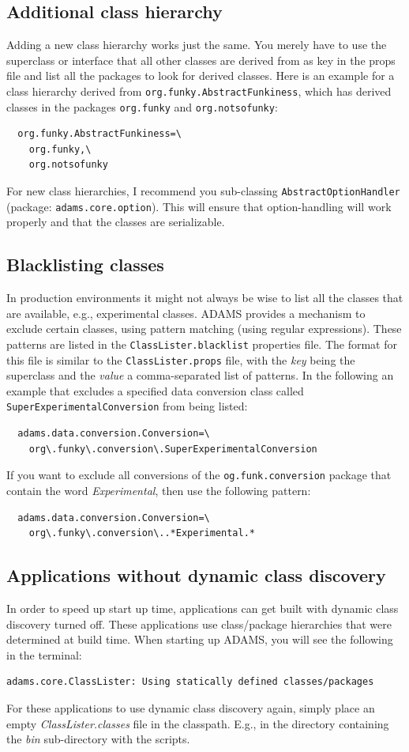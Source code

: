 \subsection{Additional class hierarchy}
Adding a new class hierarchy works just the same. You merely have to use the
superclass or interface that all other classes are derived from as key in the props file and
list all the packages to look for derived classes. Here is an example for a
class hierarchy derived from \texttt{org.funky.AbstractFunkiness}, which has
derived classes in the packages \texttt{org.funky} and \texttt{org.notsofunky}:
\begin{verbatim}
  org.funky.AbstractFunkiness=\
    org.funky,\
    org.notsofunky
\end{verbatim}
For new class hierarchies, I recommend you sub-classing \texttt{AbstractOptionHandler}
(package: \texttt{adams.core.option}). This will ensure that option-handling
will work properly and that the classes are serializable.

\subsection{Blacklisting classes}
In production environments it might not always be wise to list all the classes
that are available, e.g., experimental classes. ADAMS provides a mechanism to
exclude certain classes, using pattern matching (using regular expressions).
These patterns are listed in the \texttt{ClassLister.blacklist} properties file.
The format for this file is similar to the \texttt{ClassLister.props} file, with
the \textit{key} being the superclass and the \textit{value} a comma-separated
list of patterns. In the following an example that excludes a specified data
conversion class called \texttt{SuperExperimentalConversion} from being listed:
\begin{verbatim}
  adams.data.conversion.Conversion=\
    org\.funky\.conversion\.SuperExperimentalConversion
\end{verbatim}
If you want to exclude all conversions of the \texttt{og.funk.conversion}
package that contain the word \textit{Experimental}, then use the following
pattern:
\begin{verbatim}
  adams.data.conversion.Conversion=\
    org\.funky\.conversion\..*Experimental.*
\end{verbatim}

\subsection{Applications without dynamic class discovery}
In order to speed up start up time, applications can get built with
dynamic class discovery turned off. These applications use class/package
hierarchies that were determined at build time. When starting up ADAMS, you
will see the following in the terminal:
\begin{verbatim}
adams.core.ClassLister: Using statically defined classes/packages
\end{verbatim}
For these applications to use dynamic class discovery again, simply place
an empty \textit{ClassLister.classes} file in the classpath. E.g., in the
directory containing the \textit{bin} sub-directory with the scripts.

